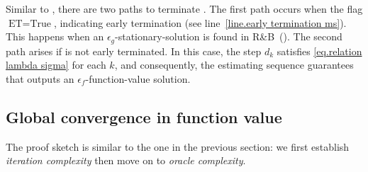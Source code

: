 \documentclass{article}
\begin{document}
Similar to , there are two paths to terminate . The first path occurs when the flag $\textrm{ET} = \text{True}$, indicating early termination (see line~\ref{line.early termination ms}). This happens when an $\epsilon_g$-stationary-solution is found in R\&B~().
The second path arises if  is not early terminated. In this case, the step $d_k$ satisfies \eqref{eq.relation lambda sigma} for each $k$, and consequently, the estimating sequence guarantees that  outputs an $\epsilon_f$-function-value solution.
\subsection{Global convergence in function value}
The proof sketch is similar to the one in the previous section: we first establish \textit{iteration complexity} then move on to \textit{oracle complexity}.
\end{document}
